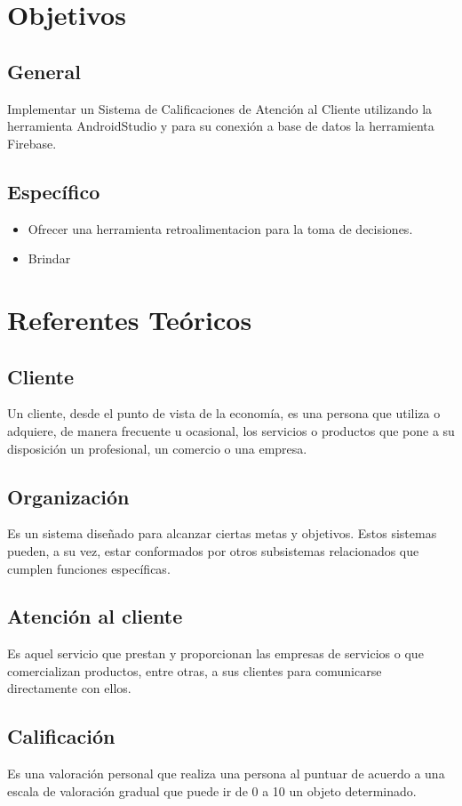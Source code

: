 \documentclass[preprint,12pt]{elsarticle}
\begin{document}
\section{Objetivos}
	\subsection{General }	
		Implementar un Sistema de Calificaciones de Atención al Cliente utilizando la herramienta AndroidStudio y para su conexión a base de datos la herramienta Firebase.
	\subsection{Específico }	

\begin{itemize}
	\item Ofrecer una herramienta retroalimentacion para la toma de decisiones.
	\item Brindar 
\end{itemize}


\section{Referentes Teóricos}
\subsection{Cliente}
Un cliente, desde el punto de vista de la economía, es una persona que utiliza o adquiere, de manera frecuente u ocasional, los servicios o productos que pone a su disposición un profesional, un comercio o una empresa.
\subsection{Organización}
Es un sistema diseñado para alcanzar ciertas metas y objetivos. Estos sistemas pueden, a su vez, estar conformados por otros subsistemas relacionados que cumplen funciones específicas.
\subsection{Atención al cliente}
Es aquel servicio que prestan y proporcionan las empresas de servicios o que comercializan productos, entre otras, a sus clientes para comunicarse directamente con ellos.
\subsection{Calificación}
Es una valoración personal que realiza una persona al puntuar de acuerdo a una escala de valoración gradual que puede ir de 0 a 10 un objeto determinado.
\end{document}
